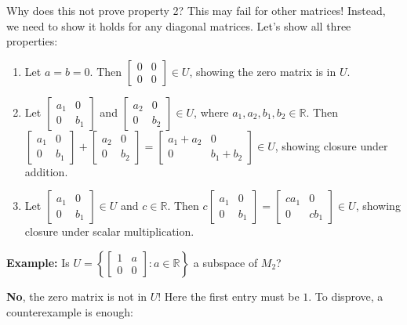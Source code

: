 \documentclass{article}
\begin{document}
Why does this not prove property 2? This may fail for other matrices! Instead, we need to show it holds for any diagonal matrices. Let's show all three properties:
\begin{enumerate}
    \item Let $a = b = 0$. Then $\begin{bmatrix} 0 & 0 \\ 0 & 0 \end{bmatrix} \in U$, showing the zero matrix is in $U$.
    \item Let $\begin{bmatrix} a_1 & 0 \\ 0 & b_1 \end{bmatrix}$ and $\begin{bmatrix} a_2 & 0 \\ 0 & b_2 \end{bmatrix} \in U$, where $a_1, a_2, b_1, b_2 \in \mathbb{R}$. Then $\begin{bmatrix} a_1 & 0 \\ 0 & b_1 \end{bmatrix} + \begin{bmatrix} a_2 & 0 \\ 0 & b_2 \end{bmatrix} = \begin{bmatrix} a_1 + a_2 & 0 \\ 0 & b_1 + b_2 \end{bmatrix} \in U$, showing closure under addition.
    \item Let $\begin{bmatrix} a_1 & 0 \\ 0 & b_1 \end{bmatrix} \in U$ and $c \in \mathbb{R}$. Then $c \begin{bmatrix} a_1 & 0 \\ 0 & b_1 \end{bmatrix} = \begin{bmatrix} ca_1 & 0 \\ 0 & cb_1 \end{bmatrix} \in U$, showing closure under scalar multiplication.
\end{enumerate}

\textbf{Example:} Is $U = \left\{ \begin{bmatrix} 1 & a \\ 0 & 0 \end{bmatrix} : a \in \mathbb{R} \right\}$ a subspace of $M_2$?

\textbf{No}, the zero matrix is not in $U$! Here the first entry must be $1$. To disprove, a counterexample is enough:
\end{document}
